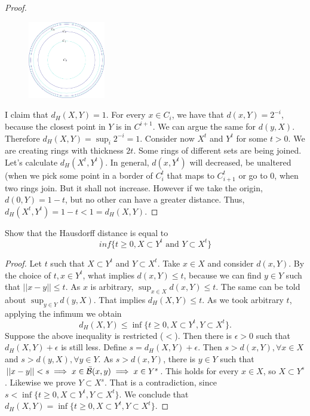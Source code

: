 \begin{proof}
\begin{figure}[H]
    \centering
    \includegraphics[width = 0.3\textwidth]{../images/circle-inside-circle.png}
\end{figure}

I claim that $d_H(X,Y) = 1$. For every $x \in C_i$, we have that $d(x,Y) =
2^{-i}$, because the closest point in $Y$ is in $C^{i+1}$. We can argue the
same for $d(y,X)$. Therefore $d_H(X,Y) = \sup_i 2^{-i} = 1$. Consider now
$X^t$ and $Y^t$ for some $t > 0$. We are creating rings with thickness $2t$.
Some rings of different sets are being joined. Let's calculate $d_H(X^t,
Y^t)$. In general, $d(x,Y^t)$ will decreased, be unaltered (when we pick some
point in a border of $C_i^t$ that maps to $C_{i+1}^t$ or go to $0$, when two
rings join. But it shall not increase. However if we take the origin, $d(0,Y)
= 1 - t$, but no other can have a greater distance. Thus, $d_H(X^t, Y^t) = 1-t
< 1 = d_H(X, Y)$. 

\end{proof}

\noindent\linia

\begin{exercise}
    Show that the Hausdorff distance is equal to
    $$inf\{t \ge 0, X \subset Y^t \text{ and } Y \subset X^t\}$$
\end{exercise}

\begin{proof}

Let $t$ such that $X \subset Y^t$ and $Y \subset X^t$. Take $x \in X$ and
consider $d(x,Y)$. By the choice of $t, x \in Y^t$, what implies $d(x,Y) \le
t$, because we can find $y \in Y$ such that $||x - y|| \le t$. As $x$ is
arbitrary, $\sup_{x \in X} d(x,Y) \le t$. The same can be told about $\sup_{y
\in Y} d(y, X)$. That implies $d_H(X,Y) \le t$. As we took arbitrary $t$,
applying the infimum we obtain 
$$d_H(X,Y) \le \inf\{t \ge 0, X \subset Y^t, Y \subset X^t\}.$$
Suppose the above inequality is restricted ($<$). Then there is $\epsilon > 0$
such that $d_H(X, Y) + \epsilon$ is still less. Define $s = d_H(X,Y) + \epsilon$. Then $s > d(x,Y), \forall x \in X$ and $s > d(y,
X), \forall y \in Y$. As $s > d(x,Y)$, there is $y \in Y$ such that $||x - y||
< s \implies x \in \bar{\mathcal{B}}(x,y) \implies x \in Y^s$. This holds for every $x
\in X$, so $X \subset Y^s$. Likewise we prove $Y \subset X^s$. That is a
contradiction, since $s < \inf\{t \ge 0, X \subset Y^t, Y \subset X^t\}$. We
conclude that $d_H(X, Y) = \inf\{t \ge 0, X \subset Y^t, Y \subset X^t\}.$  

\end{proof}

